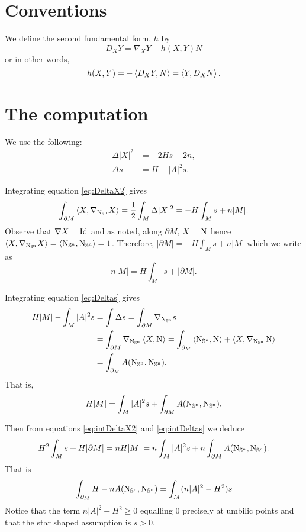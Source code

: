 \documentclass{amsart}
\begin{document}
\section{Conventions}

We define the second fundamental form, \(h\) by
\[
D_X Y = \nabla_X Y - h(X, Y) N
\]
or in other words,
\[
h(X, Y) = -\left\langle D_X Y,N \right\rangle = \left\langle Y,D_X N \right\rangle.
\]

\section{The computation}

We use the following:
\begin{align}
\Delta |X|^2 &= -2 H s + 2n, \label{eq:DeltaX2} \\
\Delta s &= H - |A|^2 s. \label{eq:Deltas}
\end{align}

Integrating equation \eqref{eq:DeltaX2} gives
\[
\int_{\partial M} \left\langle X,\nabla_{\operatorname{N_{\mathbb{S}^n}}} X \right\rangle = \frac{1}{2} \int_M \Delta |X|^2 = -H \int_M s + n |M|.
\]
Observe that \(\nabla X = \operatorname{Id}\) and as noted, along \(\partial M\), \(X = \operatorname{N}\) hence \(\left\langle X,\nabla_{\operatorname{N_{\mathbb{S}^n}}} X \right\rangle = \left\langle \operatorname{N_{\mathbb{S}^n}},\operatorname{N_{\mathbb{S}^n}} \right\rangle = 1\). Therefore, \(|\partial M| = -H \int_M s + n |M|\) which we write as
\begin{equation}
\label{eq:intDeltaX2}
n |M| = H \int_M s + |\partial M|.
\end{equation}

Integrating equation \eqref{eq:Deltas} gives
\[
\begin{split}
H |M| - \int_M |A|^2 s &= \int \Delta s = \int_{\partial M} \nabla_{\operatorname{N_{\mathbb{S}^n}}} s \\
&= \int_{\partial M} \nabla_{\operatorname{N_{\mathbb{S}^n}}} \left\langle X,\operatorname{N} \right\rangle = \int_{\partial_M} \left\langle \operatorname{N_{\mathbb{S}^n}},\operatorname{N} \right\rangle + \left\langle X,\nabla_{\operatorname{N_{\mathbb{S}^n}}} \operatorname{N} \right\rangle \\
&= \int_{\partial_M} A(\operatorname{N_{\mathbb{S}^n}}, \operatorname{N_{\mathbb{S}^n}}).
\end{split}
\]
That is,
\begin{equation}
\label{eq:intDeltas}
H |M| = \int_M |A|^2 s + \int_{\partial M} A(\operatorname{N_{\mathbb{S}^n}}, \operatorname{N_{\mathbb{S}^n}}).
\end{equation}

Then from equations \eqref{eq:intDeltaX2} and \eqref{eq:intDeltas} we deduce
\[
H^2 \int_M s + H |\partial M| = n H |M| = n \int_M |A|^2 s + n \int_{\partial M} A(\operatorname{N_{\mathbb{S}^n}}, \operatorname{N_{\mathbb{S}^n}}).
\]
That is
\[
\int_{\partial_M} H - n A(\operatorname{N_{\mathbb{S}^n}}, \operatorname{N_{\mathbb{S}^n}}) = \int_M (n|A|^2 - H^2) s
\]
Notice that the term \(n|A|^2 - H^2 \geq 0\) equalling \(0\) precisely at umbilic points and that the star shaped assumption is \(s > 0\).
\end{document}

